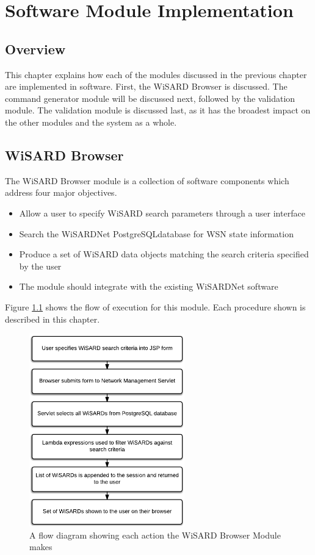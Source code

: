 
\chapter{Software Module Implementation}
\label{Chapter 5}

\section{Overview}
This chapter explains how each of the modules discussed in the previous chapter are implemented in software. First, the WiSARD Browser is discussed. The command generator module will be discussed next, followed by the validation module. The validation module is discussed last, as it has the broadest impact on the other modules and the system as a whole. 

\section{WiSARD Browser}
The WiSARD Browser module is a collection of software components which address four major objectives.

\begin{itemize}
	\item Allow a user to specify WiSARD search parameters through a user interface
	\item Search the WiSARDNet PostgreSQLdatabase for WSN state information
	\item Produce a set of WiSARD data objects matching the search criteria specified by the user
	\item The module should integrate with the existing WiSARDNet software
\end{itemize}

Figure \ref{fig:wisard_browser_flow} shows the flow of execution for this module. Each procedure shown is described in this chapter.

\begin{figure}[H]
	\centering
	\includegraphics[width=0.6\textwidth]{figures/flow_diagram_wisard_browser.png}
	\caption{A flow diagram showing each action the WiSARD Browser Module  makes}
	\label{fig:wisard_browser_flow}
\end{figure}

